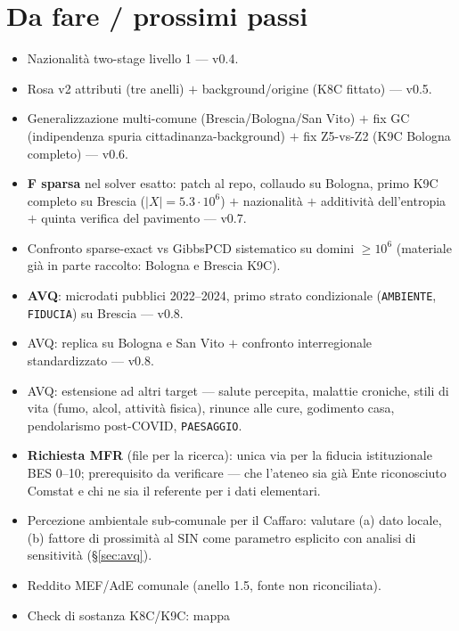 \documentclass[11pt,a4paper]{article}
\newcommand{\code}[1]{\texttt{#1}}
\begin{document}
\section{Da fare / prossimi passi}
\label{sec:todo}
\begin{itemize}[leftmargin=*,itemsep=1pt]
  \item[$\boxtimes$] Nazionalit\`a two-stage livello 1 --- v0.4.
  \item[$\boxtimes$] Rosa v2 attributi (tre anelli) $+$ background/origine
  (K8C fittato) --- v0.5.
  \item[$\boxtimes$] Generalizzazione multi-comune (Brescia/Bologna/San
  Vito) $+$ fix GC (indipendenza spuria cittadinanza-background) $+$ fix
  Z5-vs-Z2 (K9C Bologna completo) --- v0.6.
  \item[$\boxtimes$] \textbf{F sparsa} nel solver esatto: patch al repo,
  collaudo su Bologna, primo K9C completo su Brescia
  ($|X|=5.3\cdot10^6$) $+$ nazionalit\`a $+$ additivit\`a dell'entropia
  $+$ quinta verifica del pavimento --- v0.7.
  \item[$\square$] Confronto sparse-exact vs GibbsPCD sistematico su
  domini $\ge10^6$ (materiale gi\`a in parte raccolto: Bologna e Brescia
  K9C).
  \item[$\boxtimes$] \textbf{AVQ}: microdati pubblici 2022--2024, primo
  strato condizionale (\code{AMBIENTE}, \code{FIDUCIA}) su Brescia --- v0.8.
  \item[$\boxtimes$] AVQ: replica su Bologna e San Vito $+$ confronto
  interregionale standardizzato --- v0.8.
  \item[$\square$] AVQ: estensione ad altri target --- salute percepita,
  malattie croniche, stili di vita (fumo, alcol, attivit\`a fisica),
  rinunce alle cure, godimento casa, pendolarismo post-COVID,
  \code{PAESAGGIO}.
  \item[$\square$] \textbf{Richiesta MFR} (file per la ricerca): unica via
  per la fiducia istituzionale BES 0--10; prerequisito da verificare ---
  che l'ateneo sia gi\`a Ente riconosciuto Comstat e chi ne sia il
  referente per i dati elementari.
  \item[$\square$] Percezione ambientale sub-comunale per il Caffaro:
  valutare (a) dato locale, (b) fattore di prossimit\`a al SIN come
  parametro esplicito con analisi di sensitivit\`a (\S\ref{sec:avq}).
  \item[$\square$] Reddito MEF/AdE comunale (anello 1.5, fonte non
  riconciliata).
  \item[$\square$] Check di sostanza K8C/K9C: mappa

\end{itemize}
\end{document}
